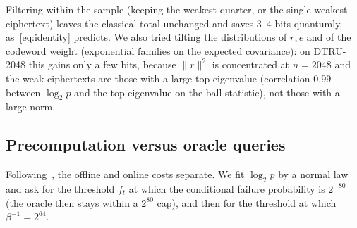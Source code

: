 \documentclass[11pt,a4paper]{article}
\theoremstyle{definition}
\theoremstyle{remark}
\begin{document}
\begin{table}[t]
\centering\small
{}
\caption{Classical work for one decryption failure (decapsulations),
without a query cap. Core-SVP values are for the NTRU key-recovery problem;
the DTRU-2048 estimate is a primal-BDD fallback with low confidence.}
\label{tab:boost}
\end{table}

Filtering within the sample (keeping the weakest quarter, or the single
weakest ciphertext) leaves the classical total unchanged and saves $3$--$4$
bits quantumly, as~\eqref{eq:identity} predicts. We also tried tilting the
distributions of $r,e$ and of the codeword weight (exponential families on
the expected covariance): on DTRU-2048 this gains only a few bits, because
$\|r\|^2$ is concentrated at $n=2048$ and the weak ciphertexts are those
with a large top eigenvalue (correlation $0.99$ between $\log_2 p$ and the
top eigenvalue on the ball statistic), not those with a large norm.

\subsection{Precomputation versus oracle queries}
\label{sec:cap}
Following~\cite{DVV19}, the offline and online costs separate. We fit
$\log_2 p$ by a normal law and ask for the threshold $f_t$ at which the
conditional failure probability is $2^{-80}$ (the oracle then stays within
a $2^{80}$ cap), and then for the threshold at which $\beta^{-1}=2^{64}$.
\end{document}
